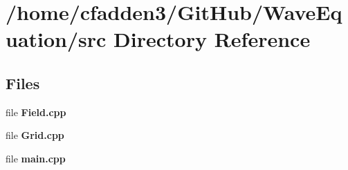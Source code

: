 \section{/home/cfadden3/\+Git\+Hub/\+Wave\+Equation/src Directory Reference}
\label{dir_68267d1309a1af8e8297ef4c3efbcdba}
\subsection*{Files}
\begin{DoxyCompactItemize}
\item 
file {\bfseries Field.\+cpp}
\item 
file {\bfseries Grid.\+cpp}
\item 
file {\bfseries main.\+cpp}
\end{DoxyCompactItemize}
